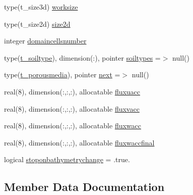 \begin{DoxyCompactItemize}
\item 
type(t\+\_\+size3d) \mbox{\hyperlink{structmoduleporousmedia_1_1t__porousmedia_ac813303deb15422be712de3388306b14}{worksize}}
\item 
type(t\+\_\+size2d) \mbox{\hyperlink{structmoduleporousmedia_1_1t__porousmedia_a451f25e157c816f4cdaa052c1301ec75}{size2d}}
\item 
integer \mbox{\hyperlink{structmoduleporousmedia_1_1t__porousmedia_acde8de5298f9feac10c39407ac4764dc}{domaincellsnumber}}
\item 
type(\mbox{\hyperlink{structmoduleporousmedia_1_1t__soiltype}{t\+\_\+soiltype}}), dimension(\+:), pointer \mbox{\hyperlink{structmoduleporousmedia_1_1t__porousmedia_a5c677dd5447e023507b2f55f39e4d640}{soiltypes}} =$>$ null()
\item 
type(\mbox{\hyperlink{structmoduleporousmedia_1_1t__porousmedia}{t\+\_\+porousmedia}}), pointer \mbox{\hyperlink{structmoduleporousmedia_1_1t__porousmedia_a3081dd55b9db8d0d2206be79eaec2c65}{next}} =$>$ null()
\item 
real(8), dimension(\+:,\+:,\+:), allocatable \mbox{\hyperlink{structmoduleporousmedia_1_1t__porousmedia_a1fa9cbe6b915c1006a767f99dc891a82}{fluxuacc}}
\item 
real(8), dimension(\+:,\+:,\+:), allocatable \mbox{\hyperlink{structmoduleporousmedia_1_1t__porousmedia_acecbc3c9fc8d96779564925c51417ac5}{fluxvacc}}
\item 
real(8), dimension(\+:,\+:,\+:), allocatable \mbox{\hyperlink{structmoduleporousmedia_1_1t__porousmedia_aad41f041301001f242bfc932a4db5c24}{fluxwacc}}
\item 
real(8), dimension(\+:,\+:,\+:), allocatable \mbox{\hyperlink{structmoduleporousmedia_1_1t__porousmedia_a2ad4784791742888c6936dd52583fcb1}{fluxwaccfinal}}
\item 
logical \mbox{\hyperlink{structmoduleporousmedia_1_1t__porousmedia_aaa3d6a488e3fa99252552a87e907d8b9}{stoponbathymetrychange}} = .true.
\end{DoxyCompactItemize}


\subsection{Member Data Documentation}
\mbox{\label{structmoduleporousmedia_1_1t__porousmedia_a10029826da5627b6e1c0bc2999886702}} 
